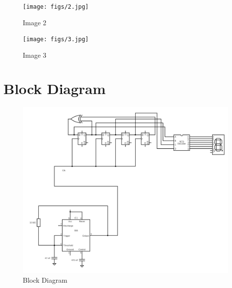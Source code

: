 \documentclass{article}
\begin{document}
\begin{figure}[ht]
	\centering
	\texttt{[image: figs/2.jpg]}
	\caption{Image 2}
	\label{fig:view}
\end{figure}
\FloatBarrier

\begin{figure}[ht]
	\centering
	\texttt{[image: figs/3.jpg]}
	\caption{Image 3}
	\label{fig:view}
\end{figure}
\FloatBarrier

\section*{Block Diagram}

\begin{figure}[ht]
	\centering
	\includegraphics[width=0.7\linewidth]{figs/BlockDiagram.png}
	\caption{Block Diagram}
	\label{fig:view}
\end{figure}
\FloatBarrier
\end{document}
